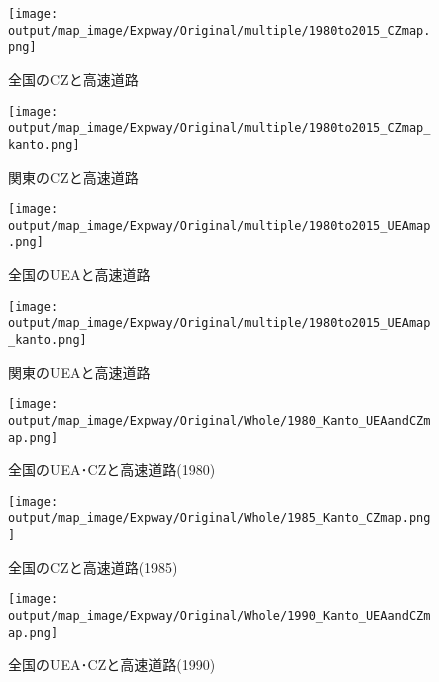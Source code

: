 \documentclass{ltjsarticle}
\begin{document}
\clearpage


\begin{figure}[pbth]
  \centering
  \texttt{[image: output/map\_image/Expway/Original/multiple/1980to2015\_CZmap.png]}
  \caption{\label{allCZandExpway}全国のCZと高速道路}
\end{figure}

\begin{figure}[pbth]
  \centering
  \texttt{[image: output/map\_image/Expway/Original/multiple/1980to2015\_CZmap\_kanto.png]}
  \caption{\label{KanCZandExpway}関東のCZと高速道路}
\end{figure}


\begin{figure}[pbth]
  \centering
  \texttt{[image: output/map\_image/Expway/Original/multiple/1980to2015\_UEAmap.png]}
  \caption{\label{allUEAandExpway}全国のUEAと高速道路}
\end{figure}


\begin{figure}[pbth]
  \centering
  \texttt{[image: output/map\_image/Expway/Original/multiple/1980to2015\_UEAmap\_kanto.png]}
  \caption{\label{KanUEAandExpway}関東のUEAと高速道路}
\end{figure}

\begin{figure}[pbth]
  \centering
  \texttt{[image: output/map\_image/Expway/Original/Whole/1980\_Kanto\_UEAandCZmap.png]}
  \caption{\label{1980:allCZandUEA:Expway}全国のUEA･CZと高速道路(1980)}
\end{figure}


\begin{figure}[pbth]
  \centering
  \texttt{[image: output/map\_image/Expway/Original/Whole/1985\_Kanto\_CZmap.png]}
  \caption{\label{1985:allCZandUEA:Expway}全国のCZと高速道路(1985)}
\end{figure}


\begin{figure}[pbth]
  \centering
  \texttt{[image: output/map\_image/Expway/Original/Whole/1990\_Kanto\_UEAandCZmap.png]}
  \caption{\label{1990:allCZandUEA:Expway}全国のUEA･CZと高速道路(1990)}
\end{figure}
\end{document}
